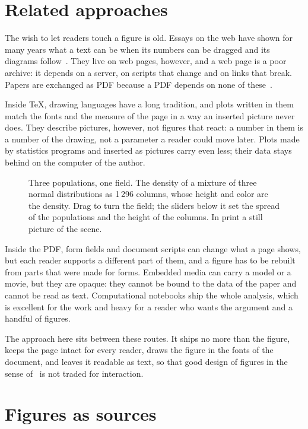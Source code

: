 \documentclass[10pt,twocolumn]{article}
\newcommand\figurehint{%
  \par\vspace{4pt}\hfill\sflhint[\textcolor{hint}{\itshape\footnotesize Interactive figure: open this PDF with the stickyflow
  extension}]\par\smallskip}
\begin{document}
\section{Related approaches}

The wish to let readers touch a figure is old. Essays on the web have shown for many years what a text can be when its numbers can be
dragged and its diagrams follow~\cite{victor}. They live on web pages, however, and a web page is a poor archive: it depends on a
server, on scripts that change and on links that break. Papers are exchanged as PDF because a PDF depends on none of these~\cite{iso}.

Inside TeX, drawing languages have a long tradition, and plots written in them match the fonts and the measure of the page in a way an
inserted picture never does. They describe pictures, however, not figures that react: a number in them is a number of the drawing, not
a parameter a reader could move later. Plots made by statistics programs and inserted as pictures carry even less; their data stays
behind on the computer of the author.

\begin{figure}[t]
\figurehint
\centering
{}
\caption{Three populations, one field. The density of a mixture of three normal distributions as 1\,296 columns, whose height and
color are the density. Drag to turn the field; the sliders below it set the spread of the populations and the height of the columns.
In print a still picture of the scene.}
\label{fig:field}
\end{figure}

Inside the PDF, form fields and document scripts can change what a page shows, but each reader supports a different part of them, and
a figure has to be rebuilt from parts that were made for forms. Embedded media can carry a model or a movie, but they are opaque: they
cannot be bound to the data of the paper and cannot be read as text. Computational notebooks ship the whole analysis, which is
excellent for the work and heavy for a reader who wants the argument and a handful of figures.

The approach here sits between these routes. It ships no more than the figure, keeps the page intact for every reader, draws the figure
in the fonts of the document, and leaves it readable as text, so that good design of figures in the sense of~\cite{tufte} is not
traded for interaction.

\section{Figures as sources}
\end{document}
